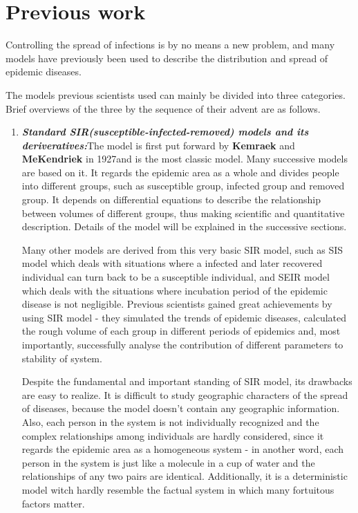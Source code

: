 \section{Previous work}

Controlling the spread of infections is by no means a new problem, and many models have previously been used to describe the distribution and spread of epidemic diseases.

The models previous scientists used can mainly be divided into three categories. Brief overviews of the three by the sequence of their advent are as follows.
\begin{enumerate}
  \item \textbf{\emph{Standard SIR(susceptible-infected-removed) models and its deriveratives:}}The model is first put forward by \textbf{Kemraek} and \textbf{MeKendriek} in 1927\cite{SIR}and is the most classic model. Many successive models are based on it. It regards the epidemic area as a whole and divides people into different groups, such as susceptible group, infected group and removed group. It depends on differential equations to describe the relationship between volumes of different groups, thus making scientific and quantitative description. Details of the model will be explained in the successive sections.
  \par Many other models are derived from this very basic SIR model, such as SIS model\cite{SIS} which deals with situations where a infected and later recovered individual can turn back to be a susceptible individual, and SEIR model\cite{SEIR} which deals with the situations where incubation period of the epidemic disease is not negligible. Previous scientists gained great achievements by using SIR model - they simulated the trends of epidemic diseases, calculated the rough volume of each group in different periods of epidemics and, most importantly, successfully analyse the contribution of different parameters to stability of system. 
  \par Despite the fundamental and important standing of SIR model, its drawbacks are easy to realize. It is difficult to study geographic characters of the spread of diseases, because the model doesn't contain any geographic information. Also, each person in the system is not individually recognized and the complex relationships among individuals are hardly considered, since it regards the epidemic area as a homogeneous system - in another word, each person in the system is just like a molecule in a cup of water and the relationships of any two pairs are identical. Additionally, it is a deterministic model witch hardly resemble the factual system in which many fortuitous factors matter.

\end{enumerate}
